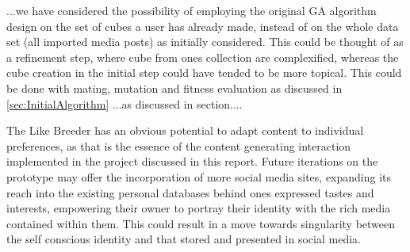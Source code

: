 \documentclass[]{article}
\begin{document}
...we have considered the possibility of employing the original GA algorithm design on the set of cubes a user has already made, instead of on the whole data set (all imported media posts) as initially considered.  This could be thought of as a refinement step, where cube from ones collection are complexified, whereas the cube creation in the initial step could have tended to be more topical.  This could be done with mating, mutation and fitness evaluation as discussed in \autoref{sec:InitialAlgorithm}  ...as discussed in section....

The Like Breeder has an obvious potential to adapt content to individual preferences, as that is the essence of the content generating interaction implemented in the project discussed in this report.  Future iterations on the prototype may offer the incorporation of more social media sites, expanding its reach into the existing personal databases behind ones expressed tastes and interests, empowering their owner to portray their identity with the rich media contained within them.  This could result in a move towards singularity between the self conscious identity and that stored and presented in social media.
\end{document}
